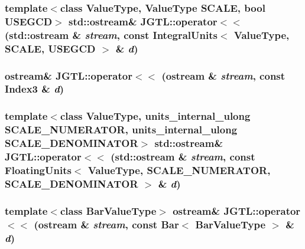 \hypertarget{namespace_j_g_t_l_bb4eaae6cdeb0bb91835f543745cf38e}{
\subsubsection[operator$<$$<$]{\setlength{\rightskip}{0pt plus 5cm}template$<$class Value\-Type, Value\-Type SCALE, bool USEGCD$>$ std::ostream\& JGTL::operator$<$$<$ (std::ostream \& {\em stream}, const Integral\-Units$<$ Value\-Type, SCALE, USEGCD $>$ \& {\em d})}}
\label{namespace_j_g_t_l_bb4eaae6cdeb0bb91835f543745cf38e}


\hypertarget{namespace_j_g_t_l_da86017e720d1a0d7bc6ee620e6e798f}{
\subsubsection[operator$<$$<$]{\setlength{\rightskip}{0pt plus 5cm}ostream\& JGTL::operator$<$$<$ (ostream \& {\em stream}, const Index3 \& {\em d})}}
\label{namespace_j_g_t_l_da86017e720d1a0d7bc6ee620e6e798f}


\hypertarget{namespace_j_g_t_l_86ab99d9902f6c5772fb0adc0cb2a020}{
\subsubsection[operator$<$$<$]{\setlength{\rightskip}{0pt plus 5cm}template$<$class Value\-Type, units\_\-internal\_\-ulong SCALE\_\-NUMERATOR, units\_\-internal\_\-ulong SCALE\_\-DENOMINATOR$>$ std::ostream\& JGTL::operator$<$$<$ (std::ostream \& {\em stream}, const Floating\-Units$<$ Value\-Type, SCALE\_\-NUMERATOR, SCALE\_\-DENOMINATOR $>$ \& {\em d})}}
\label{namespace_j_g_t_l_86ab99d9902f6c5772fb0adc0cb2a020}


\hypertarget{namespace_j_g_t_l_c7b88574d9cbabb871f978d45333686d}{
\subsubsection[operator$<$$<$]{\setlength{\rightskip}{0pt plus 5cm}template$<$class Bar\-Value\-Type$>$ ostream\& JGTL::operator$<$$<$ (ostream \& {\em stream}, const Bar$<$ Bar\-Value\-Type $>$ \& {\em d})}}
\label{namespace_j_g_t_l_c7b88574d9cbabb871f978d45333686d}


